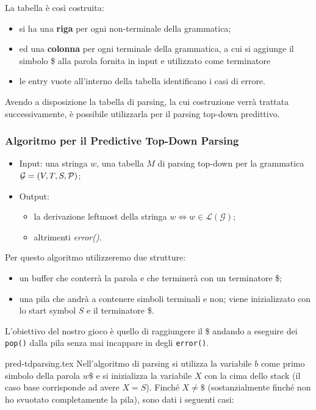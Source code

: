 \documentclass[class=book, crop=false, oneside, 12pt]{standalone}
\begin{document}
La tabella è così costruita:
\begin{itemize}
    \item si ha una \textbf{riga} per ogni non-terminale della grammatica;
    \item ed una \textbf{colonna} per ogni terminale della grammatica, a cui si aggiunge il simbolo \$ alla parola fornita in input e utilizzato come terminatore
    \item le entry vuote all'interno della tabella identificano i casi di errore.
\end{itemize}

Avendo a disposizione la tabella di parsing, la cui costruzione verrà trattata successivamente, è possibile utilizzarla per il parsing top-down predittivo.

\subsubsection{Algoritmo per il Predictive Top-Down Parsing}
\begin{itemize}
    \item Input: una stringa \(w\), una tabella \(M\) di parsing top-down per la grammatica \(\mathcal{G} = (V, T, S, \mathcal{P})\);
    \item Output: 
    \begin{itemize}
        \item la derivazione leftmost della stringa \(w \iff w \in \mathcal{L(G)}\);
        \item altrimenti \emph{error()}.
    \end{itemize}
\end{itemize}
Per questo algoritmo utilizzeremo due strutture:
\begin{itemize}
    \item un buffer che conterrà la parola e che terminerà con un terminatore \$;
    \item una pila che andrà a contenere simboli terminali e non; viene inizializzato con lo start symbol \(S\) e il terminatore \$.
\end{itemize}
L'obiettivo del nostro gioco è quello di raggiungere il \$ andando a eseguire dei \texttt{pop()} dalla pila senza mai incappare in degli \texttt{error()}.

{pred-tdparsing.tex}
Nell'algoritmo di parsing si utilizza la variabile \(b\) come primo simbolo della parola \(w\$\) e si inizializza la variabile \(X\) con la cima dello stack (il caso base corrisponde ad avere \(X = S\)). Finché \(X \neq \$\) (sostanzialmente finché non ho svuotato completamente la pila), sono dati i seguenti casi:
\end{document}
